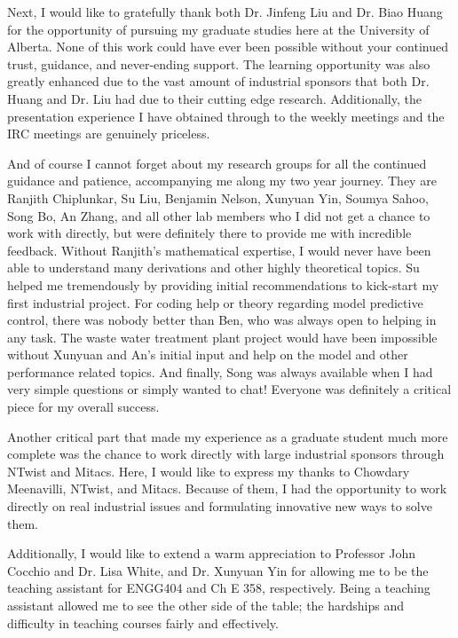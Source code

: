 \documentclass[12pt]{report}
\begin{document}
Next, I would like to gratefully thank both Dr. Jinfeng Liu and Dr. Biao Huang for the opportunity of pursuing my graduate studies here at the University of Alberta.  None of this work could have ever been possible without your continued trust, guidance, and never-ending support.  The learning opportunity was also greatly enhanced due to the vast amount of industrial sponsors that both Dr. Huang and Dr. Liu had due to their cutting edge research.  Additionally, the presentation experience I have obtained through to the weekly meetings and the IRC meetings are genuinely priceless.

And of course I cannot forget about my research groups for all the continued guidance and patience, accompanying me along my two year journey.  They are Ranjith Chiplunkar, Su Liu, Benjamin Nelson, Xunyuan Yin, Soumya Sahoo, Song Bo, An Zhang, and all other lab members who I did not get a chance to work with directly, but were definitely there to provide me with incredible feedback.  Without Ranjith's mathematical expertise, I would never have been able to understand many derivations and other highly theoretical topics.  Su helped me tremendously by providing initial recommendations to kick-start my first industrial project.  For coding help or theory regarding model predictive control, there was nobody better than Ben, who was always open to helping in any task. The waste water treatment plant project would have been impossible without Xunyuan and An's initial input and help on the model and other performance related topics.  And finally, Song was always available when I had very simple questions or simply wanted to chat!  Everyone was definitely a critical piece for my overall success.  

Another critical part that made my experience as a graduate student much more complete was the chance to work directly with large industrial sponsors through NTwist and Mitacs.  Here, I would like to express my thanks to Chowdary Meenavilli, NTwist, and Mitacs.  Because of them, I had the opportunity to work directly on real industrial issues and formulating innovative new ways to solve them.

Additionally, I would like to extend a warm appreciation to Professor John Cocchio and Dr. Lisa White, and Dr. Xunyuan Yin for allowing me to be the teaching assistant for ENGG404 and Ch E 358, respectively.  Being a teaching assistant allowed me to see the other side of the table; the hardships and difficulty in teaching courses fairly and effectively.
\end{document}
